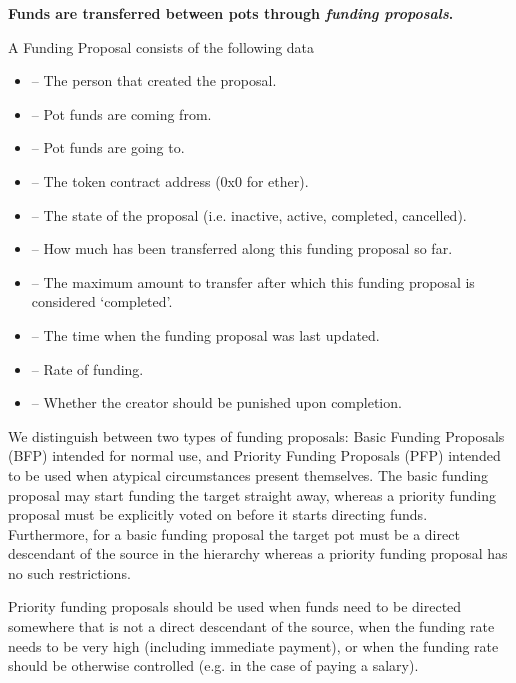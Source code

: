 \textbf{Funds are transferred between pots through \emph{funding proposals}.}
\begin{description}
 \item A Funding Proposal consists of the following data
 \begin{itemize}
  \item {}	--	The person that created the proposal.
  \item {}	--	Pot funds are coming from.
  \item {}	--	Pot funds are going to.
  \item {}	--	The token contract address (0x0 for ether).
  \item {}	--	The state of the proposal (i.e. inactive, active, completed, cancelled).
  \item {}	--	How much has been transferred along this funding proposal so far.
  \item {}	--	The maximum amount to transfer after which this funding proposal is considered `completed'.
  \item {}	--	The time when the funding proposal was last updated.
  \item {}	--	Rate of funding.
  \item {} -- Whether the creator should be punished upon completion.
 \end{itemize}

\end{description}
We distinguish between two types of funding proposals: Basic Funding Proposals (BFP) intended for normal use, and Priority Funding Proposals (PFP) intended to be used when atypical circumstances present themselves. The basic funding proposal may start funding the target straight away, whereas a priority funding proposal must be explicitly voted on before it starts directing funds. Furthermore, for a basic funding proposal the target pot must be a direct descendant of the source in the hierarchy whereas a priority funding proposal has no such restrictions.

Priority funding proposals should be used when funds need to be directed somewhere that is not a direct descendant of the source, when the funding rate needs to be very high (including immediate payment), or when the funding rate should be otherwise controlled (e.g. in the case of paying a salary).

